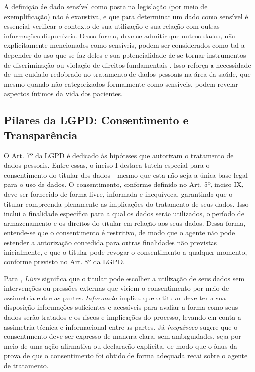 A definição de dado sensível como posta na legislação (por meio de exemplificação) não é exaustiva, e que para determinar um dado como sensível é essencial verificar o contexto de sua utilização e sua relação com outras informações disponíveis. Dessa forma, deve-se admitir que outros dados, não explicitamente mencionados como sensíveis, podem ser considerados como tal a depender do uso que se faz deles e sua potencialidade de se tornar instrumentos de discriminação ou violação de direitos fundamentais \cite{TefferViola2020}. Isso reforça a necessidade de um cuidado redobrado no tratamento de dados pessoais na área da saúde, que mesmo quando não categorizados formalmente como sensíveis, podem revelar aspectos íntimos da vida dos pacientes.

\subsection{Pilares da LGPD: Consentimento e Transparência}
\label{subsec:fund-consentimento}

O Art. 7º da LGPD é dedicado às hipóteses que autorizam o tratamento de dados pessoais. Entre essas, o inciso I destaca tutela especial para o consentimento do titular dos dados - mesmo que esta não seja a única base legal para o uso de dados. O consentimento, conforme definido no Art. 5º, inciso IX, deve ser fornecido de forma livre, informada e inequívoca, garantindo que o titular compreenda plenamente as implicações do tratamento de seus dados. Isso inclui a finalidade específica para a qual os dados serão utilizados, o período de armazenamento e os direitos do titular em relação aos seus dados. Dessa forma, entende-se que o consentimento é restritivo, de modo que o agente não pode estender a autorização concedida para outras finalidades não previstas inicialmente, e que o titular pode revogar o consentimento a qualquer momento, conforme previsto no Art. 8º da LGPD.

Para , \textit{Livre} significa que o titular pode escolher a utilização de seus dados sem intervenções ou pressões externas que viciem o consentimento por meio de assimetria entre as partes. \textit{Informado} implica que o titular deve ter a sua disposição informações suficientes e acessíveis para avaliar a forma como seus dados serão tratados e os riscos e implicações do processo, levando em conta a assimetria técnica e informacional entre as partes. Já \textit{inequívoco} sugere que o consentimento deve ser expresso de maneira clara, sem ambiguidades, seja por meio de uma ação afirmativa ou declaração explícita, de modo que o ônus da prova de que o consentimento foi obtido de forma adequada recai sobre o agente de tratamento.

